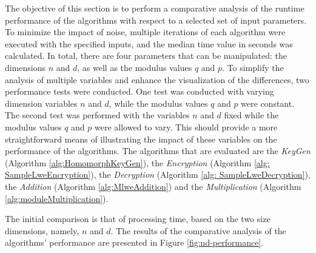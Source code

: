 The objective of this section is to perform a comparative analysis of the runtime performance of the algorithms with respect to a selected set of input parameters. To minimize the impact of noise, multiple iterations of each algorithm were executed with the specified inputs, and the median time value in seconds was calculated. In total, there are four parameters that can be manipulated: the dimensions $n$ and $d$, as well as the modulus values $q$ and $p$. To simplify the analysis of multiple variables and enhance the visualization of the differences, two performance tests were conducted. One test was conducted with varying dimension variables $n$ and $d$, while the modulus values $q$ and $p$ were constant. The second test was performed with the variables $n$ and $d$ fixed while the modulus values $q$ and $p$ were allowed to vary. This should provide a more straightforward means of illustrating the impact of these variables on the performance of the algorithms. The algorithms that are evaluated are the \textit{KeyGen} (Algorithm \ref{alg:HomomorphKeyGen}), the \textit{Encryption} (Algorithm \ref{alg: SampleLweEncryption}), the \textit{Decryption} (Algorithm \ref{alg: SampleLweDecryption}), the \textit{Addition} (Algorithm \ref{alg:MlweAddition}) and the \textit{Multiplication} (Algorithm \ref{alg:moduleMultiplication}).

The initial comparison is that of processing time, based on the two size dimensions, namely, $n$ and $d$. The results of the comparative analysis of the algorithms' performance are presented in Figure \ref{fig:nd-performance}. 

